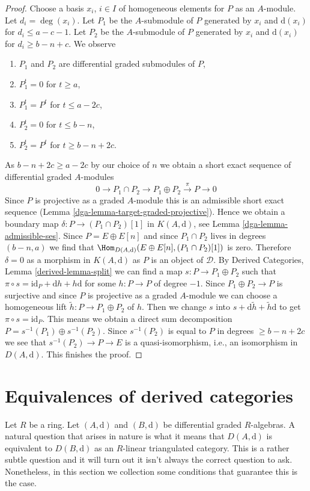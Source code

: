 \begin{proof}
\medskip\noindent
Choose a basis $x_i$, $i \in I$ of homogeneous elements for $P$ as an
$A$-module. Let $d_i = \deg(x_i)$.
Let $P_1$ be the $A$-submodule of $P$ generated by $x_i$ and
$\text{d}(x_i)$ for $d_i \leq a - c - 1$.
Let $P_2$ be the $A$-submodule of $P$ generated by $x_i$ and
$\text{d}(x_i)$ for $d_i \geq b - n + c$.
We observe
\begin{enumerate}
\item $P_1$ and $P_2$ are differential graded submodules of $P$,
\item $P_1^t = 0$ for $t \geq a$,
\item $P_1^t = P^t$ for $t \leq a - 2c$,
\item $P_2^t = 0$ for $t \leq b - n$,
\item $P_2^t = P^t$ for $t \geq b - n + 2c$.
\end{enumerate}
As $b - n + 2c \geq a - 2c$ by our choice of $n$
we obtain a short exact sequence of differential graded $A$-modules
$$
0 \to P_1 \cap P_2 \to P_1 \oplus P_2 \xrightarrow{\pi} P \to 0
$$
Since $P$ is projective as a graded $A$-module this is an admissible
short exact sequence (Lemma \ref{dga-lemma-target-graded-projective}).
Hence we obtain a boundary map
$\delta : P \to (P_1 \cap P_2)[1]$ in $K(A, \text{d})$, see
Lemma \ref{dga-lemma-admissible-ses}.
Since $P = E \oplus E[n]$ and since $P_1 \cap P_2$ lives in
degrees $(b - n, a)$ we find that
$\Hom_{D(A, \text{d})}(E \oplus E[n], (P_1 \cap P_2)[1])$ is
zero. Therefore $\delta = 0$ as a morphism in $K(A, \text{d})$
as $P$ is an object of $\mathcal{D}$.
By Derived Categories, Lemma \ref{derived-lemma-split}
we can find a map $s : P \to P_1 \oplus P_2$ such that
$\pi \circ s = \text{id}_P + \text{d}h + h\text{d}$ for some $h : P \to P$
of degree $-1$. Since $P_1 \oplus P_2 \to P$ is surjective and since $P$
is projective as a graded $A$-module we can choose a homogeneous
lift $\tilde h : P \to P_1 \oplus P_2$ of $h$. Then we change
$s$ into $s + \text{d} \tilde h + \tilde h \text{d}$ to get
$\pi \circ s = \text{id}_P$. This means we obtain a direct
sum decomposition $P = s^{-1}(P_1) \oplus s^{-1}(P_2)$.
Since $s^{-1}(P_2)$ is equal to $P$ in degrees $\geq b - n + 2c$
we see that $s^{-1}(P_2) \to P \to E$ is a quasi-isomorphism,
i.e., an isomorphism in $D(A, \text{d})$. This finishes the proof.
\end{proof}

\section{Equivalences of derived categories}
\label{dga-section-equivalence}
Let $R$ be a ring. Let $(A, \text{d})$ and $(B, \text{d})$ be differential
graded $R$-algebras. A natural question that arises in nature is what
it means that $D(A, \text{d})$ is equivalent to $D(B, \text{d})$
as an $R$-linear triangulated category. This is a rather subtle question
and it will turn out it isn't always the correct question to ask.
Nonetheless, in this section we collection some conditions
that guarantee this is the case.

